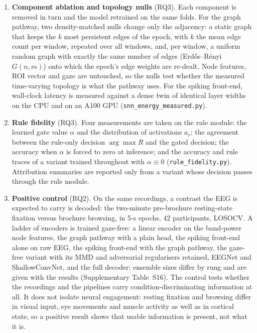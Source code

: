 \documentclass[pdflatex,sn-basic,Numbered,twocolumn,iicol]{sn-jnl}
\theoremstyle{thmstyleone}%
\theoremstyle{thmstyletwo}%
\theoremstyle{thmstylethree}%
\begin{document}
\begin{enumerate}
\item \textbf{Component ablation and topology nulls} (RQ3). Each component is removed in turn and the model retrained on the same folds. For the graph pathway, two density-matched nulls change only the adjacency: a static graph that keeps the $k$ most persistent edges of the epoch, with $k$ the mean edge count per window, repeated over all windows, and, per window, a uniform random graph with exactly the same number of edges (Erd\H{o}s--R\'enyi $G(n,m)$) onto which the epoch's edge weights are re-dealt. Node features, ROI vector and gaze are untouched, so the nulls test whether the measured time-varying topology is what the pathway uses. For the spiking front-end, wall-clock latency is measured against a dense twin of identical layer widths on the CPU and on an A100 GPU (\texttt{snn\_energy\_measured.py}).
\item \textbf{Rule fidelity} (RQ3). Four measurements are taken on the rule module: the learned gate value $\alpha$ and the distribution of activations $a_r$; the agreement between the rule-only decision $\arg\max R$ and the gated decision; the accuracy when $\alpha$ is forced to zero at inference; and the accuracy and rule traces of a variant trained throughout with $\alpha\equiv0$ (\texttt{rule\_fidelity.py}). Attribution summaries are reported only from a variant whose decision passes through the rule module.
\item \textbf{Positive control} (RQ2). On the same recordings, a contrast the EEG is expected to carry is decoded: the two-minute pre-brochure resting-state fixation versus brochure browsing, in 5-s epochs, 42 participants, LOSOCV. A ladder of encoders is trained gaze-free: a linear encoder on the band-power node features, the graph pathway with a plain head, the spiking front-end alone on raw EEG, the spiking front-end with the graph pathway, the gaze-free variant with its MMD and adversarial regularisers retained, EEGNet and ShallowConvNet, and the full decoder; ensemble sizes differ by rung and are given with the results (Supplementary Table~S16). The control tests whether the recordings and the pipelines carry condition-discriminating information at all. It does not isolate neural engagement: resting fixation and browsing differ in visual input, eye movements and muscle activity as well as in cortical state, so a positive result shows that usable information is present, not what it is.

\end{enumerate}
\end{document}
